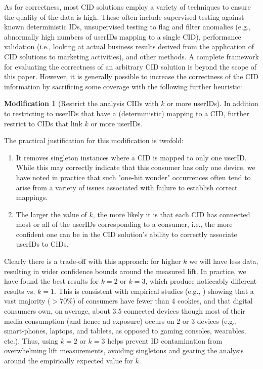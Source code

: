 \documentclass[11pt,a4paper]{article}
\theoremstyle{definition}
\theoremstyle{remark}
\theoremstyle{definition}
\theoremstyle{definition}
\theoremstyle{definition}
\theoremstyle{definition}
\theoremstyle{definition}
\newtheorem{modification}{Modification}[section]
\theoremstyle{definition}
\begin{document}
As for correctness, most CID solutions employ a variety of techniques to ensure the quality of the data is high. These often include supervised testing against known deterministic IDs, unsupervised testing to flag and filter anomalies (e.g., abnormally high numbers of userIDs mapping to a single CID), performance validation (i.e., looking at actual business results derived from the application of CID solutions to marketing activities), and other methods. A complete framework for evaluating the correctness of an arbitrary CID solution is beyond the scope of this paper. However, it is generally possible to increase the correctness of the CID information by sacrificing some coverage with the following further heuristic: 

\begin{modification}[Restrict the analysis CIDs with $k$ or more userIDs]
In addition to restricting to userIDs that have a (deterministic) mapping to a CID, further restrict to CIDs that link $k$ or more userIDs. 
\end{modification}

The practical justification for this modification is twofold: 
\begin{enumerate}
\item It removes singleton instances where a CID is mapped to only one userID. While this may correctly indicate that this consumer has only one device, we have noted in practice that such "one-hit wonder" occurrences often tend to arise from a variety of issues associated with failure to establish correct mappings. 
\item The larger the value of $k$, the more likely it is that each CID has connected most or all of the userIDs corresponding to a consumer, i.e., the more confident one can be in the CID solution's ability to correctly associate userIDs to CIDs.
\end{enumerate}

Clearly there is a trade-off with this approach: for higher $k$ we will have less data, resulting in wider confidence bounds around the measured lift. In practice, we have found the best results for $k=2$ or $k=3$, which produce noticeably different results vs. $k=1$. This is consistent with empirical studies (e.g., \cite{coey2016people}) showing that a vast majority ($> 70\%$) of consumers have fewer than 4 cookies, and that digital consumers own, on average, about 3.5 connected devices \cite{emarketer-2016}
though most of their media consumption (and hence ad exposure) occurs on 2 or 3 devices (e.g., smart-phones, laptops, and tablets, as opposed to gaming consoles, wearables, etc.). Thus, using $k=2$ or $k=3$ helps prevent ID contamination from overwhelming lift measurements, avoiding singletons and gearing the analysis around the empirically expected value for $k$.
\end{document}
